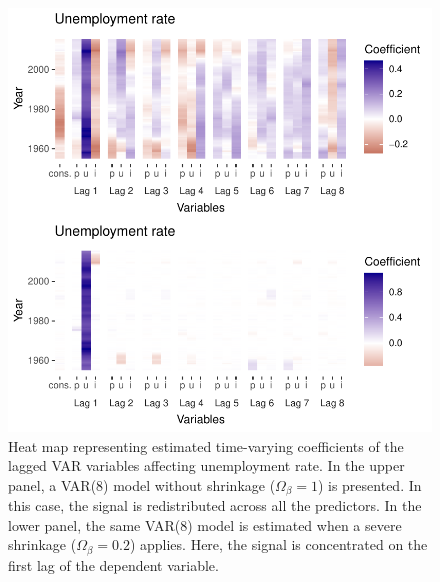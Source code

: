 \documentclass[
  12pt,
]{book}
\theoremstyle{break}
\theoremstyle{nonumberplain}
\begin{document}
\begin{figure}[H]

{\centering \includegraphics{Dynamic-Shrinkage-in-Bayesian-Structural-Time-Series-and-Vector-Autoregressive-Models_files/figure-latex/myfig73-1} 

}

\caption{Heat map representing estimated time-varying coefficients of the lagged VAR variables affecting unemployment rate. In the upper panel, a VAR(8) model without shrinkage ($\Omega_\beta=1$) is presented. In this case, the signal is redistributed across all the predictors. In the lower panel, the same VAR(8) model is estimated when a severe shrinkage ($\Omega_\beta=0.2$) applies. Here, the signal is concentrated on the first lag of the dependent variable.}\label{fig:myfig73}
\end{figure}
\end{document}
